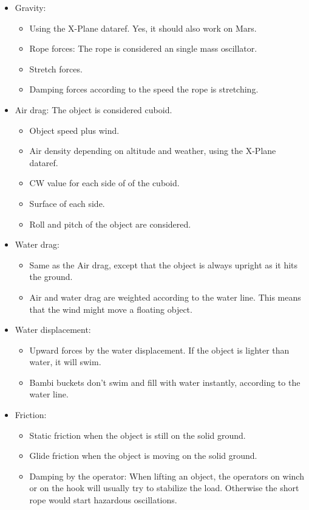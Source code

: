 \documentclass[10pt,a4]{scrartcl}
\begin{document}
\begin{itemize}
\item Gravity:
\begin{itemize}
\item Using the X-Plane dataref. Yes, it should also work on Mars.
\item Rope forces: The rope is considered an single mass oscillator.
\item Stretch forces.
\item Damping forces according to the speed the rope is stretching.
\end{itemize}
\item Air drag: The object is considered cuboid.
\begin{itemize}
\item Object speed plus wind.
\item Air density depending on altitude and weather, using the X-Plane dataref.
\item CW value for each side of of the cuboid.
\item Surface of each side.
\item Roll and pitch of the object are considered.
\end{itemize}
\item Water drag:
\begin{itemize}
\item Same as the Air drag, except that the object is always upright as it hits the ground.
\item Air and water drag are weighted according to the water line. This means that the wind might move a floating object.
\end{itemize}
\item Water displacement:
\begin{itemize}
\item Upward forces by the water displacement. If the object is lighter than water, it will swim.
\item Bambi buckets don't swim and fill with water instantly, according to the water line.
\end{itemize}
\item Friction:
\begin{itemize}
\item Static friction when the object is still on the solid ground.
\item Glide friction when the object is moving on the solid ground.
\item Damping by the operator: When lifting an object, the operators on winch or on the hook will usually try to stabilize the load. Otherwise the short rope would start hazardous oscillations.

\end{itemize}
\end{itemize}
\end{document}
